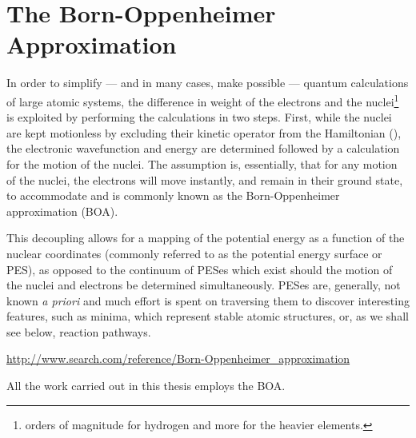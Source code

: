 \section{The Born-Oppenheimer Approximation}
\label{sec:born-oppenheimer}

In order to simplify --- and in many cases, make possible --- quantum calculations of large atomic systems, the difference in weight of the electrons and the nuclei\footnote{ orders of magnitude for hydrogen and more for the heavier elements.} is exploited by performing the calculations in two steps.
First, while the nuclei are kept motionless by excluding their kinetic operator from the Hamiltonian (), the electronic wavefunction and energy are determined followed by a calculation for the motion of the nuclei.
The assumption is, essentially, that for any motion of the nuclei, the electrons will move instantly, and remain in their ground state, to accommodate and is commonly known as the Born-Oppenheimer approximation\cite{born-oppenheimer-1927} (BOA).


This decoupling allows for a mapping of the potential energy as a function of the nuclear coordinates (commonly referred to as the potential energy surface or PES), as opposed to the continuum of PESes which exist should the motion of the nuclei and electrons be determined simultaneously.
PESes are, generally, not known \textit{a priori} and much effort is spent on traversing them to discover interesting features, such as minima, which represent stable atomic structures, or, as we shall see below, reaction pathways.


\url{http://www.search.com/reference/Born-Oppenheimer_approximation}


All the work carried out in this thesis employs the BOA.

